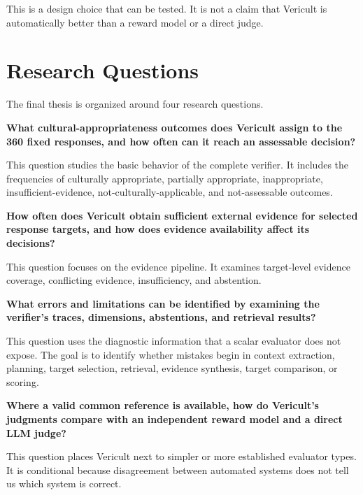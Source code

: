 This is a design choice that can be tested. It is not a claim that Vericult is automatically better than a reward model or a direct judge.
\section{Research Questions}

The final thesis is organized around four research questions.

\begin{description}[leftmargin=1.7cm,style=nextline]

\item[RQ1] \textbf{What cultural-appropriateness outcomes does Vericult assign to the 360 fixed responses, and how often can it reach an assessable decision?}

This question studies the basic behavior of the complete verifier. It includes the frequencies of culturally appropriate, partially appropriate, inappropriate, insufficient-evidence, not-culturally-applicable, and not-assessable outcomes.

\item[RQ2] \textbf{How often does Vericult obtain sufficient external evidence for selected response targets, and how does evidence availability affect its decisions?}

This question focuses on the evidence pipeline. It examines target-level evidence coverage, conflicting evidence, insufficiency, and abstention.

\item[RQ3] \textbf{What errors and limitations can be identified by examining the verifier's traces, dimensions, abstentions, and retrieval results?}

This question uses the diagnostic information that a scalar evaluator does not expose. The goal is to identify whether mistakes begin in context extraction, planning, target selection, retrieval, evidence synthesis, target comparison, or scoring.

\item[RQ4] \textbf{Where a valid common reference is available, how do Vericult's judgments compare with an independent reward model and a direct LLM judge?}

This question places Vericult next to simpler or more established evaluator types. It is conditional because disagreement between automated systems does not tell us which system is correct.

\end{description}

